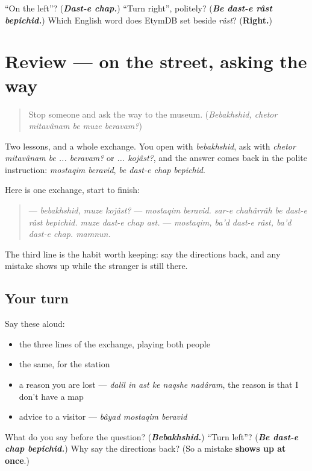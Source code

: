 \begin{tcolorbox}[breakable,colback=teal!4,colframe=teal!35!black,title={Before you move on}]
\textquotedblleft{}On the left\textquotedblright{}? (\emph{\textbf{Dast-e chap.}}) \textquotedblleft{}Turn right\textquotedblright{}, politely? (\emph{\textbf{Be dast-e râst bepichid.}}) Which English word does EtymDB set beside \emph{râst}? (\textbf{Right.})
\end{tcolorbox}
\section[(review)]{Review — on the street, asking the way}

\label{lesson:FA-R294-asking-the-way}



\begin{quote}
Stop someone and ask the way to the museum. (\emph{Bebakhshid, chetor mitavânam be muze beravam?})
\end{quote}

\begin{grammarlens}[title={What you've built}]
Two lessons, and a whole exchange. You open with \emph{bebakhshid}, ask with \emph{chetor mitavânam be ... beravam?} or \emph{... kojâst?}, and the answer comes back in the polite instruction: \emph{mostaqim beravid}, \emph{be dast-e chap bepichid}.

Here is one exchange, start to finish:

\begin{quote}
— \emph{bebakhshid, muze kojâst?} — \emph{mostaqim beravid. sar-e chahârrâh be dast-e râst bepichid. muze dast-e chap ast.} — \emph{mostaqim, ba'd dast-e râst, ba'd dast-e chap. mamnun.}
\end{quote}

The third line is the habit worth keeping: say the directions back, and any mistake shows up while the stranger is still there.
\end{grammarlens}

\subsection*{Your turn}
Say these aloud:

\begin{itemize}
\raggedright
  \item the three lines of the exchange, playing both people
  \item the same, for the station
  \item a reason you are lost — \emph{dalil in ast ke naqshe nadâram}, the reason is that I don't have a map
  \item advice to a visitor — \emph{bâyad mostaqim beravid}
\end{itemize}

\begin{tcolorbox}[breakable,colback=teal!4,colframe=teal!35!black,title={Before you move on}]
What do you say before the question? (\emph{\textbf{Bebakhshid.}}) \textquotedblleft{}Turn left\textquotedblright{}? (\emph{\textbf{Be dast-e chap bepichid.}}) Why say the directions back? (So a mistake \textbf{shows up at once}.)
\end{tcolorbox}
